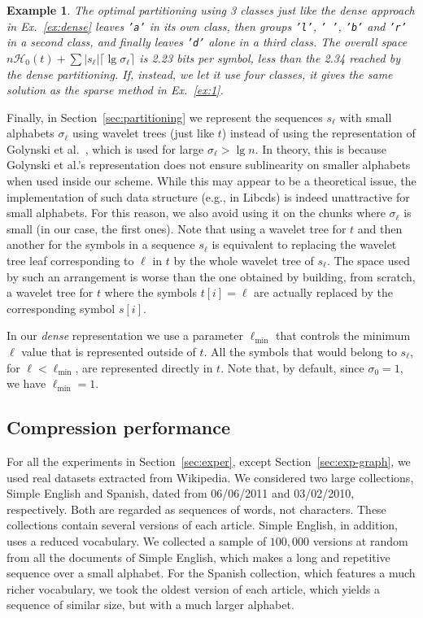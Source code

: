 \documentclass[11pt]{article}
\newtheorem{example}{Example}
\newcommand{\HH}{\mathcal{H}}
\newcommand{\Ho}{\HH_0}
\newcommand{\libcds}{{\sc Libcds}}
\begin{document}
\begin{example}
The optimal partitioning using 3 classes just like the dense approach in
Ex.~\ref{ex:dense} leaves \texttt{'a'} in its own class, then groups
\texttt{'l'}, \texttt{' '}, \texttt{'b'} and \texttt{'r'} in a second class,
and finally leaves \texttt{'d'} alone in a third class. The overall space
$n\Ho(t) + \sum |s_\ell| \lceil \lg \sigma_\ell \rceil$ is 2.23 bits per
symbol, less than the 2.34 reached by the dense partitioning. If, instead,
we let it use four classes, it gives the same solution as the sparse method in 
Ex.~\ref{ex:1}.
\end{example}

Finally, in Section~\ref{sec:partitioning} we represent the sequences 
$s_\ell$ with small alphabets $\sigma_\ell$ using wavelet trees (just 
like $t$) instead of using the representation of Golynski et al.~\cite{GMR06}, 
which is used for large $\sigma_\ell > \lg n$. In theory, this is because
Golynski et al.'s representation does not ensure sublinearity on smaller
alphabets when used inside our scheme. While this may appear to be a theoretical
issue, the implementation of such data structure (e.g., in \libcds) is indeed 
unattractive for small alphabets. For this reason, we also avoid using it on 
the chunks where $\sigma_\ell$ is small (in our case, the first ones). Note 
that using a wavelet tree for $t$ and then another for the symbols in a 
sequence $s_\ell$ is equivalent to replacing the wavelet tree leaf 
corresponding to $\ell$ in $t$ by the whole wavelet tree of $s_\ell$. The
space used by such an arrangement is worse than the one obtained by building,
from scratch, a wavelet tree for $t$ where the symbols $t[i]=\ell$ are
actually replaced by the corresponding symbol $s[i]$.

In our {\em dense} representation we use a parameter $\ell_\textrm{min}$ that
controls the minimum $\ell$ value that is represented outside of $t$. All 
the symbols that would belong to $s_\ell$, for $\ell < \ell_\textrm{min}$, are
represented directly in $t$. Note that, by default, since $\sigma_0=1$,
we have $\ell_\textrm{min}=1$.

\subsection{Compression performance}
\label{sec:exp-compr}

For all the experiments in Section~\ref{sec:exper}, except 
Section~\ref{sec:exp-graph}, we used real datasets extracted from Wikipedia. 
We considered two large collections, Simple English and Spanish, dated from
06/06/2011 and 03/02/2010, respectively. Both are regarded as sequences of
words, not characters. These collections contain several versions of each
article. Simple English, in addition, uses a reduced vocabulary. We collected 
a sample of $100{,}000$ versions at random from all the documents of Simple
English, which makes a long and repetitive sequence over a small alphabet. 
For the Spanish collection, which features a much richer vocabulary, we took 
the oldest version of each article, which yields a sequence of similar
size, but with a much larger alphabet.
\end{document}
